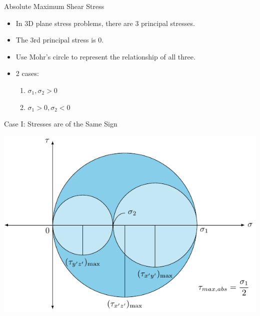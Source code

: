\documentclass[10pt, svgnames]{beamer}
\begin{document}
\begin{frame}[label={sec:orgb83a54c}]{Absolute Maximum Shear Stress}
\begin{itemize}
\item In 3D plane stress problems, there are 3 principal stresses.

\item The 3rd principal stress is 0.

\item Use Mohr's circle to represent the relationship of all three.

\item 2 cases:

\begin{enumerate}
\item \(\sigma_1, \sigma_2 > 0\)

\item \(\sigma_1 > 0, \sigma_2 < 0\)
\end{enumerate}
\end{itemize}
\end{frame}

\begin{frame}[label={sec:org29564c2}]{Case I: Stresses are of the Same Sign}
\begin{center}
\includegraphics[width=.9\linewidth]{pictures/abs-max-shear-case-I.pdf}
\end{center}
\end{frame}
\end{document}
